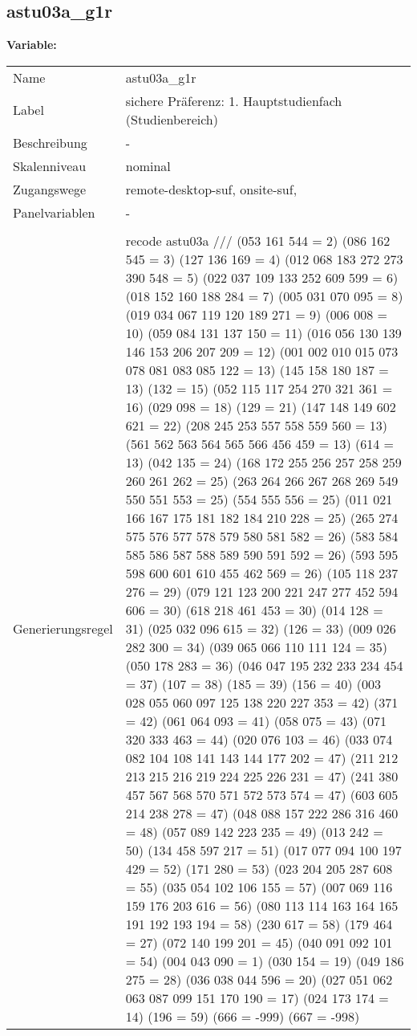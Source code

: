 	
	
	\subsection{astu03a\_g1r}
	\label{subSection:astu03a_g1r}

	\noindent\textbf{Variable:}\\
		\begin{tabular}{lL{11.3cm}}
			\label{tableVariable:astu03a_g1r}
			Name & astu03a\_g1r \\
			Label & sichere Präferenz: 1. Hauptstudienfach  (Studienbereich) \\
			Beschreibung & - \\
			Skalenniveau & nominal \\
			Zugangswege &
				remote-desktop-suf,
				onsite-suf,
 \\
			Panelvariablen & -
			 \\
			 \\
					Generierungsregel & recode astu03a /// 
(053 161 544 = 2)  (086 162 545 = 3) (127 136 169 = 4) (012 068 183 272 273 390 548 = 5) (022 037 109 133 252 609 599 = 6) (018 152 160 188 284 = 7) (005 031 070 095 = 8) (019 034 067 119 120 189 271 = 9) (006 008 = 10) (059 084 131 137 150 = 11) (016 056 130 139 146 153 206 207 209   = 12) (001 002 010 015 073 078 081 083 085 122  = 13) (145 158 180 187 = 13) (132 = 15) (052 115 117 254 270 321 361 = 16) (029 098 = 18) (129 = 21) (147 148 149 602 621 = 22) (208 245 253 557 558 559 560 = 13) (561 562 563 564 565 566 456 459 = 13) (614 = 13) (042 135 = 24) (168 172 255 256 257 258 259 260 261 262  = 25) (263 264 266 267 268 269 549 550 551 553  = 25) (554 555 556 = 25) (011 021 166 167 175 181 182 184 210 228 = 25) (265 274 575 576 577 578 579 580 581 582 = 26) (583 584 585 586 587 588 589 590 591 592  = 26) (593 595 598 600 601 610 455 462 569 = 26) (105 118 237 276 = 29) (079 121 123 200 221 247 277 452 594 606 = 30) (618 218 461 453 = 30)  (014 128 = 31) (025 032 096 615 = 32) (126 = 33) (009 026 282 300 = 34) (039 065 066 110 111 124 = 35) (050 178 283 = 36) (046 047 195 232 233 234 454 = 37) (107 = 38)    (185 = 39) (156 = 40) (003 028 055 060 097 125 138 220 227 353 = 42)  (371 = 42)  (061 064 093 = 41) (058 075 = 43) (071 320 333 463 = 44)  (020 076 103 = 46) (033 074 082 104 108 141 143 144 177 202  = 47) (211 212 213 215 216 219 224 225 226 231  = 47) (241 380 457 567 568 570 571 572 573 574 = 47) (603 605 214 238 278 = 47) (048 088 157 222 286 316 460 = 48) (057 089 142 223 235 = 49) (013 242 = 50) (134 458 597 217 = 51) (017 077 094 100 197 429 = 52) (171 280 = 53) (023 204 205 287 608 = 55) (035 054 102 106 155 = 57) (007 069 116 159 176 203 616 = 56) (080 113 114 163 164 165 191 192 193 194  = 58) (230 617 = 58) (179 464 = 27) (072 140 199 201 = 45) (040 091 092 101 = 54) (004 043 090 = 1) (030 154 = 19) (049 186 275 = 28) (036 038 044 596 = 20) (027 051 062 063 087 099 151 170 190 = 17) (024 173 174 = 14) (196 = 59) (666 = -999) (667 = -998) 

\end{tabular}
